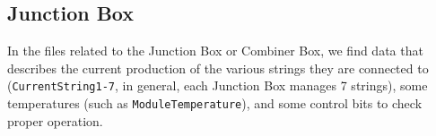 %

\subsection{Junction Box}
In the files related to the Junction Box or Combiner Box, we find data that describes
the current production of the various strings they are connected to (\verb|CurrentString1-7|,
in general, each Junction Box manages 7 strings), some temperatures (such as
\verb|ModuleTemperature|), and some control bits to check proper operation.



